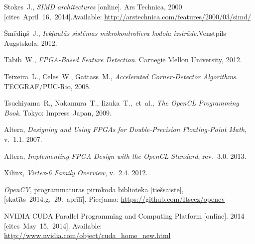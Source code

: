 {\begin{thebibliography}{99}
			Stokes~J.,
			\textit{SIMD architectures} [online]. Ars Technica, 2000 %
			[cites~April~16,~2014].\linebreak[1]
			Available: \url{http://arstechnica.com/features/2000/03/simd/}
		
			Šmēdiņš~J.,
			\textit{Iekļautās sistēmas mikrokontroliera kodola izstrāde}.\linebreak[1]
			Venstpils Augstskola, 2012.
		
			Tabib~W.,
			\textit{FPGA-Based Feature Detection}.
			Carnegie Mellon University, 2012.
		
			Teixeira~L., Celes~W., Gattass~M.,
			\textit{Accelerated Corner-Detector Algorithms}.
			TECGRAF/PUC-Rio, 2008.
		
			Tsuchiyama~R., Nakamura~T., Iizuka~T.,~et~al.,
			\textit{The OpenCL Programming Book}. Tokyo: Impress~Japan, 2009.
		
			Altera, \textit{Designing and Using FPGAs for
				Double-Precision Floating-Point Math}, v.~1.1. 2007.
		
			Altera, \textit{Implementing FPGA Design with
				the OpenCL Standard}, rev.~3.0. 2013.
		
			Xilinx, \textit{Virtex-6 Family Overview}, v.~2.4. 2012.
		
			\textit{OpenCV}, programmatūras pirmkoda bibliotēka [tiešsaiste],
			[skatīts~2014.g.~29.~aprīlī].
			Pieejama: \url{https://github.com/Itseez/opencv}
		
			NVIDIA CUDA Parallel Programming and Computing Platform [online].
			2014 [cites~May~15,~2014].
			Available: \url{http://www.nvidia.com/object/cuda_home_new.html}
	\end{thebibliography}
} %
